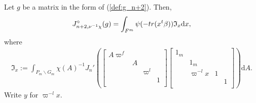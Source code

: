 \documentclass[11pt]{amsart}
\newcommand\Vp{\varpi}%
\newcommand\vp{\varphi}%
\newcommand\If{\mathfrak{I}}
\newcommand\dr{\mathrm{d}}
\newcommand\1{\mathbf{1}}
\newcommand\nid{\noindent}
\newcommand\bs{\backslash}%
\numberwithin{equation}{section}
\begin{document}
\nid 
Let $g$ be a matrix in the form of (\ref{def:g_n+2}).
Then,
\begin{align*}
J_{n+2, \nu^{-1}\chi}^\circ(g) = 
\int_{F^m} \psi(- {\rm tr}( x {}^t\beta) ) \If_x \dr x,
\end{align*} 
where 
\begin{align}
\If_x := \int_{P_m \bs G_{m}} \chi(A)^{-1} J_n'(\begin{bmatrix}
A \Vp^f & & &  \\
&A & & \\
& & \Vp^l &  \\
& & &1  \\
\end{bmatrix}
\begin{bmatrix}
1_m & & &  \\
& 1_m & & \\
& \Vp^{-l} x & 1&  \\
& & &1  \\
\end{bmatrix}) \dr A. \label{def:Ix}
\end{align} 
Write $y$ for $\Vp^{-l} x$.
\end{document}
